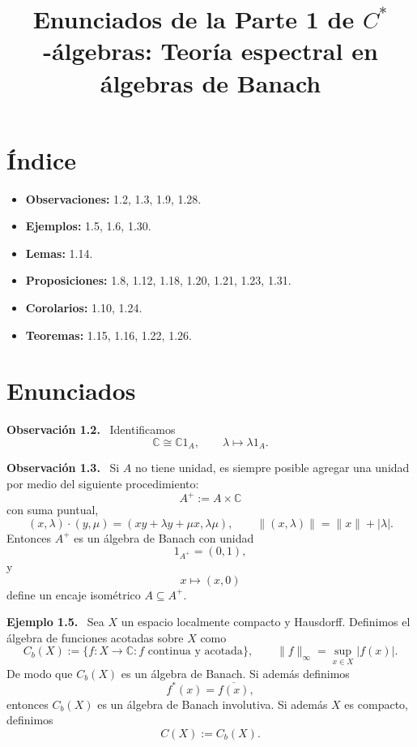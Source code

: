 \documentclass[11pt]{article}
\title{Enunciados de la Parte 1 de $C^*$-álgebras: Teoría espectral en álgebras de Banach}
\author{}
\date{}
\newenvironment{observacion}[1]
  {\par\medskip\noindent\textbf{Observación #1.}\ }
  {\par\medskip}
\newenvironment{ejemplo}[1]
  {\par\medskip\noindent\textbf{Ejemplo #1.}\ }
  {\par\medskip}
\begin{document}
\maketitle

\section*{Índice}
\begin{itemize}[leftmargin=*]
  \item \textbf{Observaciones:} 1.2, 1.3, 1.9, 1.28.
  \item \textbf{Ejemplos:} 1.5, 1.6, 1.30.
  \item \textbf{Lemas:} 1.14.
  \item \textbf{Proposiciones:} 1.8, 1.12, 1.18, 1.20, 1.21, 1.23, 1.31.
  \item \textbf{Corolarios:} 1.10, 1.24.
  \item \textbf{Teoremas:} 1.15, 1.16, 1.22, 1.26.
\end{itemize}

\section*{Enunciados}

\begin{observacion}{1.2}
Identificamos
\[
  \mathbb{C}\cong\mathbb{C}1_A,
  \qquad
  \lambda\longmapsto\lambda 1_A.
\]
\end{observacion}

\begin{observacion}{1.3}
Si $A$ no tiene unidad, es siempre posible agregar una unidad por medio del siguiente procedimiento:
\[
  A^+:=A\times\mathbb{C}
\]
con suma puntual,
\[
  (x,\lambda)\cdot(y,\mu)
  =(xy+\lambda y+\mu x,\lambda\mu),
  \qquad
  \lVert(x,\lambda)\rVert=\lVert x\rVert+|\lambda|.
\]
Entonces $A^+$ es un álgebra de Banach con unidad
\[
  1_{A^+}=(0,1),
\]
y
\[
  x\longmapsto(x,0)
\]
define un encaje isométrico $A\subseteq A^+$.
\end{observacion}

\begin{ejemplo}{1.5}
Sea $X$ un espacio localmente compacto y Hausdorff. Definimos el álgebra de funciones acotadas sobre $X$ como
\[
  C_b(X):=\{f:X\to\mathbb{C}: f\text{ continua y acotada}\},
  \qquad
  \lVert f\rVert_\infty=\sup_{x\in X}|f(x)|.
\]
De modo que $C_b(X)$ es un álgebra de Banach. Si además definimos
\[
  f^*(x)=\overline{f(x)},
\]
entonces $C_b(X)$ es un álgebra de Banach involutiva. Si además $X$ es compacto, definimos
\[
  C(X):=C_b(X).
\]
\end{ejemplo}
\end{document}
